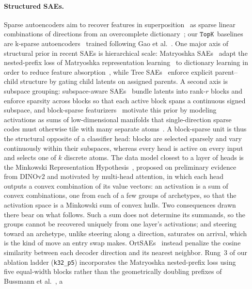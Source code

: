 \paragraph{Structured SAEs.}
Sparse autoencoders aim to recover features in
superposition~\cite{elhage2022} as sparse linear combinations of
directions from an overcomplete
dictionary~\cite{cunningham2023,bricken2023}; our $\mathop{\mathtt{TopK}}\limits$ baselines are
k-sparse autoencoders~\cite{makhzani2014} trained following Gao et
al.~\cite{gao2024}. One major axis of structural prior in recent SAEs is
hierarchical scale: Matryoshka SAEs~\cite{bussmann2025} adapt the
nested-prefix loss of Matryoshka representation
learning~\cite{kusupati2022} to dictionary learning in order to reduce
feature absorption~\cite{chanin2025}, while Tree SAEs~\cite{cao2026}
enforce explicit parent--child structure by gating child latents on
assigned parents. A second axis is subspace grouping: subspace-aware
SAEs~\cite{dalili2026} bundle latents into rank-$r$ blocks and enforce
sparsity across blocks so that each active block spans a continuous
signed subspace, and block-sparse featurizers~\cite{fel2026structuring}
motivate this prior by modeling activations as sums of low-dimensional
manifolds that single-direction sparse codes must otherwise tile with
many separate atoms~\cite{bhalla2026manifolds}. A block-sparse unit is
thus the structural opposite of a classifier head: blocks are selected
sparsely and vary continuously within their subspaces, whereas every head
is active on every input and selects one of $k$ discrete atoms.
The data model closest to a layer of heads is the Minkowski
Representation Hypothesis~\cite{fel2026rabbit}, proposed on preliminary
evidence from DINOv2 and motivated by multi-head attention, in which each
head outputs a convex combination of its value vectors: an activation is
a sum of convex combinations, one from each of a few groups of
archetypes, so that the activation space is a Minkowski sum of convex
hulls. Two consequences drawn there bear on what follows. Such a sum does
not determine its summands, so the groups cannot be recovered uniquely
from one layer's activations; and steering toward an archetype, unlike
steering along a direction, saturates on arrival, which is the kind of
move an entry swap makes.
OrtSAEs~\cite{korznikov2025} instead penalize the cosine similarity
between each decoder direction and its nearest neighbor. Rung~3 of our
ablation ladder (\texttt{k32\_p5}) incorporates the Matryoshka
nested-prefix loss using five equal-width blocks rather than the
geometrically doubling prefixes of Bussmann et al.~\cite{bussmann2025}, a
